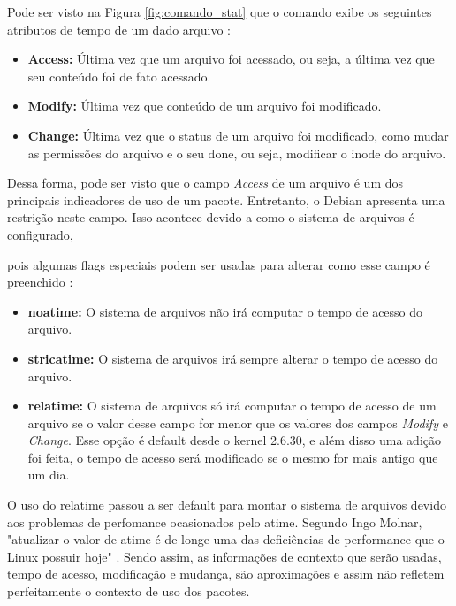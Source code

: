 Pode ser visto na Figura \ref{fig:comando_stat} que o comando exibe os seguintes
atributos de tempo de um dado arquivo \cite{1_haas}:

\begin{itemize}
    \item \textbf{Access:} Última vez que um arquivo foi acessado, ou seja, a
        última vez que seu conteúdo foi de fato acessado.
    \item \textbf{Modify:} Última vez que conteúdo de um arquivo foi modificado.
    \item \textbf{Change:} Última vez que o status de um arquivo foi modificado,
        como mudar as permissões do arquivo e o seu done, ou seja, modificar o
        inode do arquivo.
\end{itemize}

Dessa forma, pode ser visto que o campo \textit{Access} de um arquivo é um dos
principais indicadores de uso de um pacote. Entretanto, o Debian apresenta uma
restrição neste campo. Isso acontece devido a como o sistema de arquivos é
configurado, 

pois algumas flags especiais podem ser usadas para alterar como
esse campo é preenchido \cite{2_wiki.debian.org}:

\begin{itemize}
    \item \textbf{noatime:} O sistema de arquivos não irá computar o tempo de
        acesso do arquivo.
    \item \textbf{stricatime:} O sistema de arquivos irá sempre alterar o tempo
        de acesso do arquivo.
    \item \textbf{relatime:} O sistema de arquivos só irá computar o tempo de
        acesso de um arquivo se o valor desse campo for menor que os valores dos
        campos \textit{Modify} e \textit{Change}. Esse opção é default desde
        o kernel 2.6.30, e além disso uma adição foi feita, o tempo de acesso será
        modificado se o mesmo for mais antigo que um dia.
\end{itemize}

O uso do relatime passou a ser default para montar o sistema de arquivos devido
aos problemas de perfomance ocasionados pelo atime. Segundo Ingo Molnar, "atualizar o valor
de atime é de longe uma das deficiências de performance que o Linux possuir
hoje" \cite{3_corbet_2007}. Sendo assim, as informações de contexto que serão
usadas, tempo de acesso, modificação e mudança, são aproximações e assim não
refletem perfeitamente o contexto de uso dos pacotes. 

